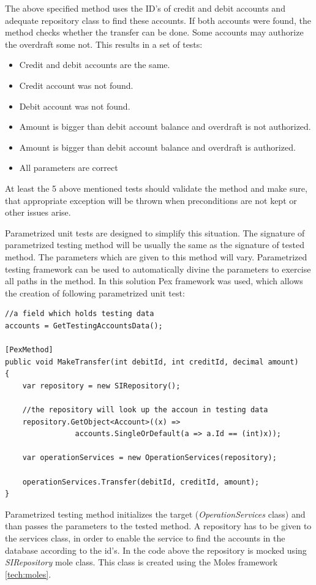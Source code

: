 The above specified method uses the ID's of credit and debit accounts and adequate repository class to find these accounts. If both accounts were found, the method checks whether the transfer can be done. Some accounts may authorize the overdraft some not. This results in a set of tests:
\begin{itemize}
\item Credit and debit accounts are the same.
\item Credit account was not found.
\item Debit account was not found.
\item Amount is bigger than debit account balance and overdraft is not authorized. 
\item Amount is bigger than debit account balance and overdraft is authorized.
\item All parameters are correct
\end{itemize}
At least the 5 above mentioned tests should validate the method and make sure, that appropriate exception will be thrown when preconditions are not kept or other issues arise.

Parametrized unit tests are designed to simplify this situation. The signature of parametrized testing method will be usually the same as the signature of tested method. The parameters which are given to this method will vary. Parametrized testing framework can be used to automatically divine the parameters to exercise all paths in the method. In this solution Pex framework was used, which allows the creation of following parametrized unit test:

\begin{verbatim}
//a field which holds testing data
accounts = GetTestingAccountsData();

[PexMethod]
public void MakeTransfer(int debitId, int creditId, decimal amount)
{
    var repository = new SIRepository();
    
    //the repository will look up the accoun in testing data
    repository.GetObject<Account>((x) => 
    			accounts.SingleOrDefault(a => a.Id == (int)x));
	
    var operationServices = new OperationServices(repository);
    
    operationServices.Transfer(debitId, creditId, amount);
}
\end{verbatim}

Parametrized testing method initializes the target (\textit{OperationServices} class) and than passes the parameters to the tested method. A repository has to be given to the services class, in order to enable the service to find the accounts in the database according to the id's. In the code above the repository is mocked using \textit{SIRepository} mole class. This class is created using the Moles framework \ref{tech:moles}.

